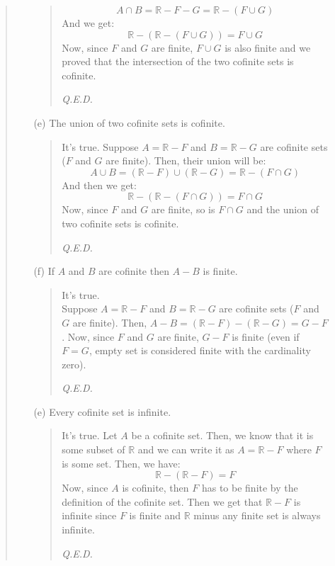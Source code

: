 \documentclass[12pt, a4paper]{article}                      %
\begin{document}
\begin{enumerate}
\begin{quote}
\begin{itemize}
\begin{quote}
$$A \cap B = \mathbb{R} - F - G = \mathbb{R} - (F \cup G)$$
And we get:
$$\mathbb{R}  - (\mathbb{R} - (F \cup G)) = F \cup G$$
Now, since $F$ and $G$ are finite, $F \cup G$ is also finite
and we proved that the intersection of the two cofinite sets is cofinite.
\begin{flushright}
\textit{Q.E.D.}
\end{flushright}
\end{quote}
\item[(e)]
The union of two cofinite sets is cofinite.
\begin{quote}
It's true.
Suppose $A = \mathbb{R} - F$ and $B = \mathbb{R} - G$ are cofinite sets ($F$ and $G$ are finite).
Then, their union will be:
$$A \cup B = (\mathbb{R} - F) \cup (\mathbb{R} - G) = \mathbb{R} - (F \cap G)$$
And then we get:
$$\mathbb{R} - (\mathbb{R} - (F \cap G)) = F \cap G$$
Now, since $F$ and $G$ are finite, so is $F \cap G$ and the union of two cofinite
sets is cofinite.
\begin{flushright}
\textit{Q.E.D.}
\end{flushright}
\end{quote}
\item[(f)]
If $A$ and $B$ are cofinite then $A - B$ is finite.
\begin{quote}
It's true.\\
Suppose $A = \mathbb{R} - F$ and $B = \mathbb{R} - G$ are cofinite sets ($F$ and $G$ are finite).
Then, $A - B = (\mathbb{R} - F) - (\mathbb{R} - G) = G - F$.
Now, since $F$ and $G$ are finite, $G - F$ is finite (even if $F = G$, empty set is considered finite
with the cardinality zero).
\begin{flushright}
\textit{Q.E.D.}
\end{flushright}
\end{quote}
\item[(e)]
Every cofinite set is infinite.
\begin{quote}
It's true.
Let $A$ be a cofinite set. Then, we know that it is some subset of $\mathbb{R}$
and we can write it as $A = \mathbb{R} - F$ where $F$ is some set.
Then, we have:
$$\mathbb{R} - (\mathbb{R} - F) = F$$
Now, since $A$ is cofinite, then $F$ has to be finite by the definition of the cofinite set.
Then we get that $\mathbb{R} - F$ is infinite since $F$ is finite and $\mathbb{R}$ minus
any finite set is always infinite.
\begin{flushright}
\textit{Q.E.D.}
\end{flushright}
\end{quote}
\end{itemize}

\end{quote}
\end{enumerate}
\end{document}
